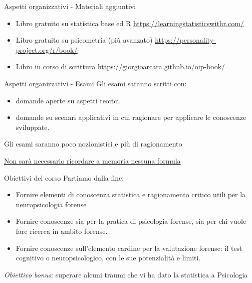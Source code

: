 \documentclass[
  ignorenonframetext,
]{beamer}
\providecommand{\tightlist}{%
  \setlength{\itemsep}{0pt}\setlength{\parskip}{0pt}}
\begin{document}
\begin{frame}{Aspetti organizzativi - Materiali aggiuntivi}
\label{aspetti-organizzativi---materiali-aggiuntivi}
\begin{itemize}
\item
  Libro gratuito su statistica base ed R
  \href{https://learningstatisticswithr.com/}{\underline{https://learningstatisticswithr.com/}}
\item
  Libro gratuito su psicometria (più avanzato)
  \href{https://personality-project.org/r/book/}{\underline{https://personality-project.org/r/book/}}
\item
  Libro in corso di scrittura
  \href{https://giorgioarcara.github.io/oip-book/}{\underline{https://giorgioarcara.github.io/oip-book/}}
\end{itemize}
\end{frame}

\begin{frame}{Aspetti organizzativi - Esami}
\label{aspetti-organizzativi---esami}
Gli esami saranno scritti con:

\begin{itemize}
\tightlist
\item
  domande aperte su aspetti teorici.
\item
  domande su scenari applicativi in cui ragionare per applicare le
  conoscenze sviluppate.
\end{itemize}

Gli esami saranno poco nozionistici e più di ragionamento

\underline{Non sarà necessario ricordare a memoria nessuna formula}
\end{frame}

\begin{frame}{Obiettivi del corso}
\label{obiettivi-del-corso}
Partiamo dalla fine:

\begin{itemize}
\tightlist
\item
  Fornire elementi di conoscenza statistica e ragionamento critico utili
  per la neuropsicologia forense
\item
  Fornire conoscenze sia per la pratica di psicologia forense, sia per
  chi vuole fare ricerca in ambito forense.
\item
  Fornire conoscenze sull'elemento cardine per la valutazione forense:
  il test cognitivo o neuropsicologico, con le sue potenzialità e
  limiti.
\end{itemize}

\emph{Obiettivo bonus}: superare alcuni traumi che vi ha dato la
statistica a Psicologia
\end{frame}
\end{document}
